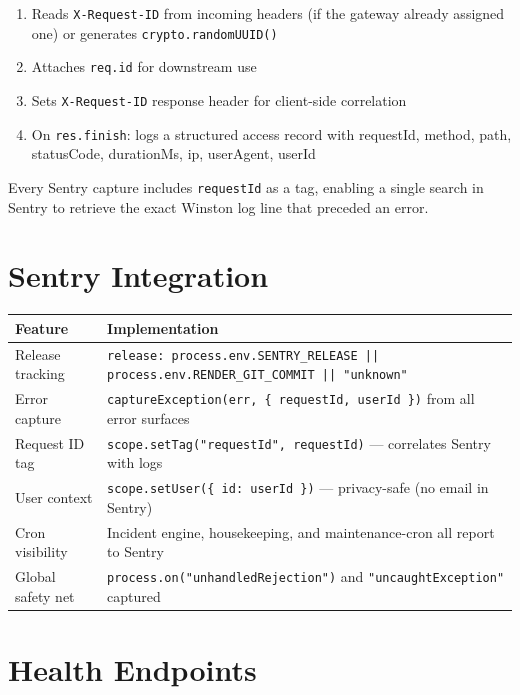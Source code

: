 \documentclass[11pt,a4paper,twoside]{book}
\newcommand{\th}[1]{\textbf{\color{white}#1}}
\begin{document}
\begin{enumerate}[leftmargin=1.5em]
  \item Reads \texttt{X-Request-ID} from incoming headers (if the gateway already assigned one) or generates \texttt{crypto.randomUUID()}
  \item Attaches \texttt{req.id} for downstream use
  \item Sets \texttt{X-Request-ID} response header for client-side correlation
  \item On \texttt{res.finish}: logs a structured access record with requestId, method, path, statusCode, durationMs, ip, userAgent, userId
\end{enumerate}

Every Sentry capture includes \texttt{requestId} as a tag, enabling a single
search in Sentry to retrieve the exact Winston log line that preceded an error.

\section{Sentry Integration}

\begin{center}\small
\begin{tabular}{p{4cm}p{8.5cm}}
\toprule
\rowcolor{headbg}\th{Feature} & \th{Implementation} \\
\midrule
Release tracking  & \texttt{release: process.env.SENTRY\_RELEASE || process.env.RENDER\_GIT\_COMMIT || "unknown"} \\
\rowcolor{rowalt}Error capture     & \texttt{captureException(err, \{ requestId, userId \})} from all error surfaces \\
Request ID tag    & \texttt{scope.setTag("requestId", requestId)} — correlates Sentry with logs \\
\rowcolor{rowalt}User context      & \texttt{scope.setUser(\{ id: userId \})} — privacy-safe (no email in Sentry) \\
Cron visibility   & Incident engine, housekeeping, and maintenance-cron all report to Sentry \\
\rowcolor{rowalt}Global safety net & \texttt{process.on("unhandledRejection")} and \texttt{"uncaughtException"} captured \\
\bottomrule
\end{tabular}
\end{center}

\section{Health Endpoints}
\end{document}
